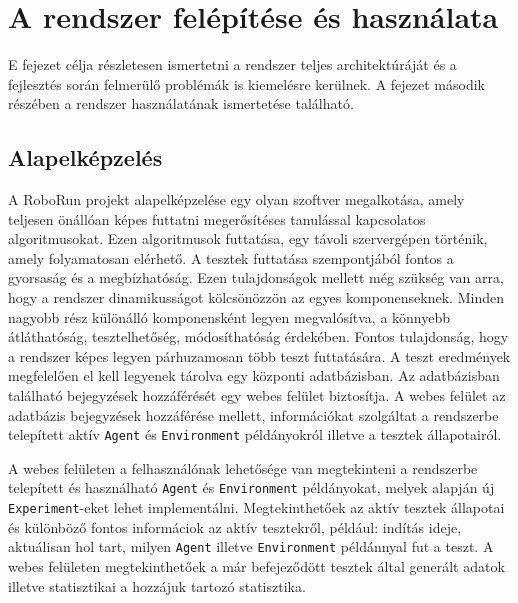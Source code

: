 \chapter{A rendszer felépítése és használata}\label{ch:Felepites}

\begin{osszefoglal}
	E fejezet célja részletesen ismertetni a rendszer teljes architektúráját és a fejlesztés során felmerülő problémák is kiemelésre kerülnek. A fejezet második részében a rendszer használatának ismertetése található. 
\end{osszefoglal}


\section{Alapelképzelés}\label{sec:Alapelkepzels}

A RoboRun projekt alapelképzelése egy olyan szoftver megalkotása, amely teljesen önállóan képes futtatni megerősítéses tanulással kapcsolatos algoritmusokat. Ezen algoritmusok futtatása, egy távoli szervergépen történik, amely folyamatosan elérhető. A tesztek futtatása szempontjából fontos a gyorsaság és a megbízhatóság. Ezen tulajdonságok mellett még szükség van arra, hogy a rendszer dinamikusságot kölcsönözzön az egyes komponenseknek. Minden nagyobb rész különálló komponensként legyen megvalósítva, a könnyebb átláthatóság, tesztelhetőség, módosíthatóság érdekében. Fontos tulajdonság, hogy a rendszer képes legyen párhuzamosan több teszt futtatására. A teszt eredmények megfelelően el kell legyenek tárolva egy központi adatbázisban. Az adatbázisban található bejegyzések hozzáférését egy webes felület biztosítja. A webes felület az adatbázis bejegyzések hozzáférése mellett, információkat szolgáltat a rendszerbe telepített aktív \texttt{Agent} és \texttt{Environment} példányokról illetve a tesztek állapotairól.

A webes felületen a felhasználónak lehetősége van megtekinteni a rendszerbe telepített és használható \texttt{Agent} és \texttt{Environment} példányokat, melyek alapján új \texttt{Experiment}-eket lehet implementálni. Megtekinthetőek az aktív tesztek állapotai és különböző fontos informáciok az aktív tesztekről, például: indítás ideje, aktuálisan hol tart, milyen \texttt{Agent} illetve \texttt{Environment} példánnyal fut a teszt. A webes felületen megtekinthetőek a már befejeződött tesztek által generált adatok illetve statisztikai a hozzájuk tartozó statisztika. 


